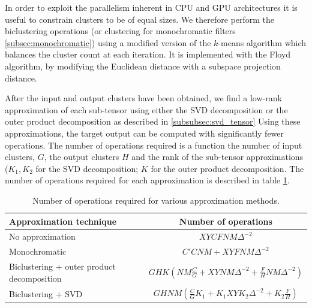 In order to exploit the parallelism inherent in CPU and GPU
architectures it is useful to constrain clusters to be of equal sizes.
We therefore perform the biclustering operations (or clustering 
for monochromatic filters \ref{subsec:monochromatic}) using a modified
version of the $k$-means algorithm which balances the cluster count at
each iteration. 
It is implemented with the Floyd algorithm, by modifying the Euclidean distance
with a subspace projection distance.

After the input and output clusters have been obtained, we find a low-rank approximation of each 
sub-tensor using either the SVD decomposition or the outer product decomposition as described in \ref{subsubsec:svd_tensor}   
Using these approximations, the target
output can be computed with significantly fewer operations. The number
of operations required is a function the number
of input clusters, $G$, the output clusters $H$ and the rank of the sub-tensor 
approximations ($K_1, K_2$ for the SVD decomposition; $K$ for the outer product decomposition.  
The number of operations required for each approximation is described in table \ref{table:ops}.


\begin{table}[t]
\tiny
\centering
\begin{tabular}{lc}
\hline
Approximation technique & Number of operations \\
\hline
No approximation & $X Y C F N M \Delta^{-2}$\\
Monochromatic & $C' C N M + X Y F N M \Delta^{-2}$\\
Biclustering + outer product decomposition & $G H K (N M \frac{C}{G} + X Y N M \Delta^{-2} + \frac{F}{H} N M \Delta^{-2})$ \\  
Biclustering + SVD & $G H N M (\frac{C}{G}K_1 + K_1 X Y K_2 \Delta^{-2} + K_2\frac{F}{H})$\\
\end{tabular}
\caption{Number of operations required for various approximation methods.} 
\label{table:ops}
\end{table}

%
%
%





